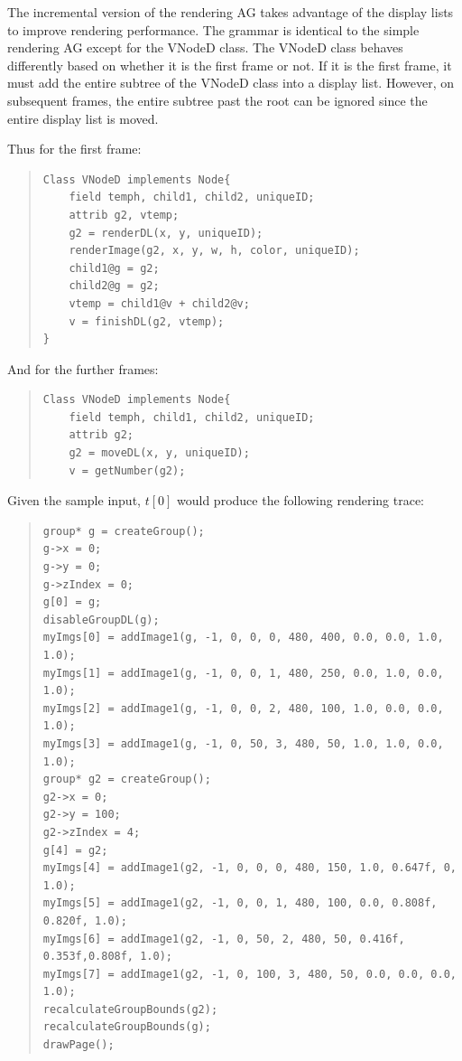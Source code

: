 \documentclass[11pt]{article}
\begin{document}
The incremental version of the rendering AG takes advantage of the display lists to improve rendering performance. The grammar is identical to the simple rendering AG except for the VNodeD class. The VNodeD class behaves differently based on whether it is the first frame or not. If it is the first frame, it must add the entire subtree of the VNodeD class into a display list. However, on subsequent frames, the entire subtree past the root can be ignored since the entire display list is moved.

Thus for the first frame:
\begin{quote}
\begin{lstlisting}
Class VNodeD implements Node{
	field temph, child1, child2, uniqueID;
	attrib g2, vtemp;
	g2 = renderDL(x, y, uniqueID);
	renderImage(g2, x, y, w, h, color, uniqueID);
	child1@g = g2;
	child2@g = g2;
	vtemp = child1@v + child2@v;
	v = finishDL(g2, vtemp);
}
\end{lstlisting}
\end{quote}

And for the further frames:
\begin{quote}
\begin{lstlisting}
Class VNodeD implements Node{
	field temph, child1, child2, uniqueID;
	attrib g2;
	g2 = moveDL(x, y, uniqueID);
	v = getNumber(g2);
\end{lstlisting}
\end{quote}

Given the sample input, $t[0]$ would produce the following rendering trace:
\begin{quote}
\begin{lstlisting}
group* g = createGroup();
g->x = 0;
g->y = 0;
g->zIndex = 0;
g[0] = g;
disableGroupDL(g);
myImgs[0] = addImage1(g, -1, 0, 0, 0, 480, 400, 0.0, 0.0, 1.0, 1.0);
myImgs[1] = addImage1(g, -1, 0, 0, 1, 480, 250, 0.0, 1.0, 0.0, 1.0);
myImgs[2] = addImage1(g, -1, 0, 0, 2, 480, 100, 1.0, 0.0, 0.0, 1.0);
myImgs[3] = addImage1(g, -1, 0, 50, 3, 480, 50, 1.0, 1.0, 0.0, 1.0);
group* g2 = createGroup();
g2->x = 0;
g2->y = 100;
g2->zIndex = 4;
g[4] = g2;
myImgs[4] = addImage1(g2, -1, 0, 0, 0, 480, 150, 1.0, 0.647f, 0, 1.0);
myImgs[5] = addImage1(g2, -1, 0, 0, 1, 480, 100, 0.0, 0.808f, 0.820f, 1.0);
myImgs[6] = addImage1(g2, -1, 0, 50, 2, 480, 50, 0.416f, 0.353f,0.808f, 1.0);
myImgs[7] = addImage1(g2, -1, 0, 100, 3, 480, 50, 0.0, 0.0, 0.0, 1.0);
recalculateGroupBounds(g2);
recalculateGroupBounds(g);
drawPage();
\end{lstlisting}
\end{quote}
\end{document}

